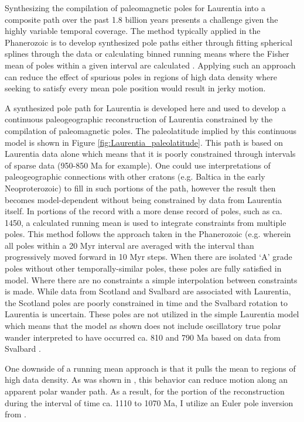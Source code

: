 \documentclass[11pt,letterpaper]{article}
\begin{document}
Synthesizing the compilation of paleomagnetic poles for Laurentia into a composite path over the past 1.8 billion years presents a challenge given the highly variable temporal coverage. The method typically applied in the Phanerozoic is to develop synthesized pole paths either through fitting spherical splines through the data or calculating binned running means where the Fisher mean of poles within a given interval are calculated \citep{Torsvik2012a}. Applying such an approach can reduce the effect of spurious poles in regions of high data density where seeking to satisfy every mean pole position would result in jerky motion. 

A synthesized pole path for Laurentia is developed here and used to develop a continuous paleogeographic reconstruction of Laurentia constrained by the compilation of paleomagnetic poles. The paleolatitude implied by this continuous model is shown in Figure \ref{fig:Laurentia_paleolatitude}. This path is based on Laurentia data alone which means that it is poorly constrained through intervals of sparse data (950-850 Ma for example). One could use interpretations of paleogeographic connections with other cratons (e.g. Baltica in the early Neoproterozoic) to fill in such portions of the path, however the result then becomes model-dependent without being constrained by data from Laurentia itself. In portions of the record with a more dense record of poles, such as ca. 1450, a calculated running mean is used to integrate constraints from multiple poles. This method follows the approach taken in the Phanerozoic (e.g. \citealp{Torsvik2012a} wherein all poles within a 20 Myr interval are averaged with the interval than progressively moved forward in 10 Myr steps. When there are isolated `A' grade poles without other temporally-similar poles, these poles are fully satisfied in model. Where there are no constraints a simple interpolation between constraints is made. While data from Scotland and Svalbard are associated with Laurentia, the Scotland poles are poorly constrained in time and the Svalbard rotation to Laurentia is uncertain. These poles are not utilized in the simple Laurentia model which means that the model as shown does not include oscillatory true polar wander interpreted to have occurred ca. 810 and 790 Ma based on data from Svalbard \citep{Maloof2006a}. 

One downside of a running mean approach is that it pulls the mean to regions of high data density. As was shown in \cite{Swanson-Hysell2019a}, this behavior can reduce motion along an apparent polar wander path. As a result, for the portion of the reconstruction during the interval of time ca. 1110 to 1070 Ma, I utilize an Euler pole inversion from \cite{Swanson-Hysell2019a}.
\end{document}

